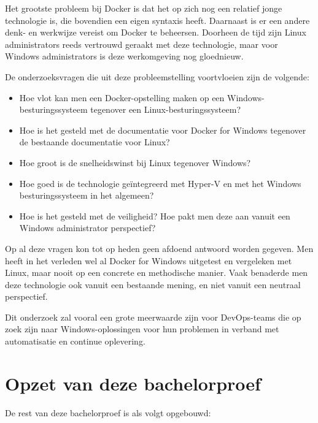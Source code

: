 Het grootste probleem bij Docker is dat het op zich nog een relatief jonge technologie is, die bovendien een eigen syntaxis heeft. Daarnaast is er een andere denk- en werkwijze vereist om Docker te beheersen. Doorheen de tijd zijn Linux administrators reeds vertrouwd geraakt met deze technologie, maar voor Windows administrators is deze werkomgeving
nog gloednieuw.

De onderzoeksvragen die uit deze probleemstelling voortvloeien zijn de volgende:

\begin{itemize}[noitemsep]
	\item Hoe vlot kan men een Docker-opstelling maken op een Windows-besturingssysteem tegenover een Linux-besturingssysteem?
	\item Hoe is het gesteld met de documentatie voor Docker for Windows tegenover de bestaande documentatie voor Linux?
	\item Hoe groot is de snelheidswinst bij Linux tegenover Windows?
	\item Hoe goed is de technologie geïntegreerd met Hyper-V en met het Windows besturingssysteem in het algemeen?
	\item Hoe is het gesteld met de veiligheid? Hoe pakt men deze aan vanuit een Windows administrator perspectief?
\end{itemize}

Op al deze vragen kon tot op heden geen afdoend antwoord worden gegeven. Men heeft in het verleden wel al Docker for Windows uitgetest en vergeleken met Linux, maar nooit op een concrete en methodische manier. Vaak benaderde men deze technologie ook vanuit een bestaande mening, en niet vanuit een neutraal perspectief.

Dit onderzoek zal vooral een grote meerwaarde zijn voor DevOps-teams die op zoek zijn naar Windows-oplossingen voor hun problemen in verband met automatisatie en continue oplevering.

\section{Opzet van deze bachelorproef}
\label{sec:opzet-bachelorproef}


De rest van deze bachelorproef is als volgt opgebouwd:

